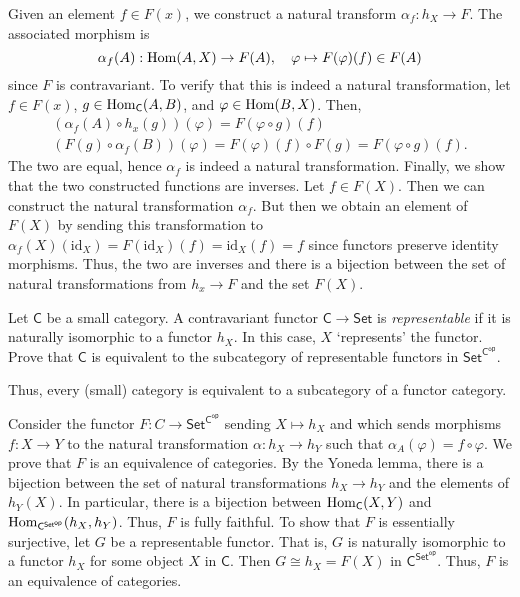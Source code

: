 \documentclass[../../master.tex]{subfiles}
\begin{document}
\begin{solution}
    Given an element $f \in F(x)$, we construct a natural transform $\alpha_f : h_X \to F$.
    The associated morphism is
    \[
        \alpha_f(A) : \operatorname{Hom}(A, X) \to F(A), \quad \varphi \mapsto F(\varphi)(f) \in F(A)
    \]
    since $F$ is contravariant.
    To verify that this is indeed a natural transformation, let $f \in F(x)$, $g \in \operatorname{Hom}_{\mathsf{C}}(A, B)$, and $\varphi \in \operatorname{Hom}(B, X)$.
    Then, 
    \begin{gather*}
        (\alpha_f(A) \circ h_x(g))(\varphi) = F(\varphi \circ g)(f) \\
        (F(g) \circ \alpha_f(B))(\varphi) = F(\varphi)(f) \circ F(g) = F(\varphi \circ g)(f).
    \end{gather*}
    The two are equal, hence $\alpha_f$ is indeed a natural transformation.
    Finally, we show that the two constructed functions are inverses.
    Let $f \in F(X)$.
    Then we can construct the natural transformation $\alpha_f$.
    But then we obtain an element of $F(X)$ by sending this transformation to  $\alpha_f(X)(\text{id}_X) = F(\text{id}_X)(f) = \text{id}_X(f) = f$ since functors preserve identity morphisms.
    Thus, the two are inverses and there is a bijection between the set of natural transformations from $h_x \to F$ and the set $F(X)$.
\end{solution}

\begin{problem}
    Let $\mathsf{C}$ be a small category.
    A contravariant functor $\mathsf{C} \to \mathsf{Set}$ is \textit{representable} if it is naturally isomorphic to a functor $h_X$.
    In this case, $X$ `represents' the functor.
    Prove that $\mathsf{C}$ is equivalent to the subcategory of representable functors in $\mathsf{Set}^{\mathsf{C}^{\mathsf{op}}}$.

    Thus, every (small) category is equivalent to a subcategory of a functor category.
\end{problem}

\begin{solution}
    Consider the functor $F : C \to \mathsf{Set}^{\mathsf{C}^{\mathsf{op}}}$ sending $X \mapsto h_X$ and which sends morphisms $f: X \to Y$ to the natural transformation $\alpha : h_X \to h_Y$ such that $\alpha_A(\varphi) = f \circ \varphi$.
    We prove that $F$ is an equivalence of categories.
    By the Yoneda lemma, there is a bijection between the set of natural transformations $h_X \to h_Y$ and the elements of $h_Y(X)$.
    In particular, there is a bijection between $\operatorname{Hom}_{\mathsf{C}}(X, Y)$ and $\operatorname{Hom}_{\mathsf{C}^{\mathsf{Set}^{\mathsf{op}}}}(h_X, h_Y)$.
    Thus, $F$ is fully faithful.
    To show that $F$ is essentially surjective, let $G$ be a representable functor.
    That is, $G$ is naturally isomorphic to a functor $h_X$ for some object $X$ in $\mathsf{C}$.
    Then $G \cong h_X = F(X)$ in $\mathsf{C}^{\mathsf{Set}^{\mathsf{op}}}$.
    Thus, $F$ is an equivalence of categories.
\end{solution}
\end{document}
